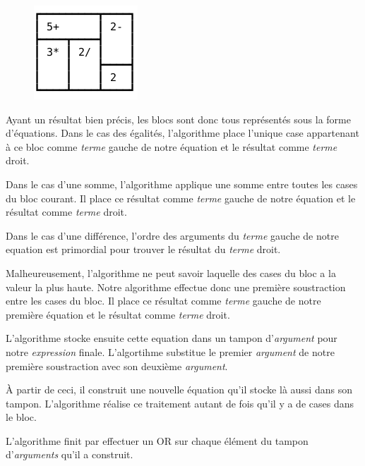 \documentclass[1]{report}
\begin{document}
\begin{itemize}
        \begin{figure}[H]
            \centering
            \includegraphics[scale=0.9]{kenekn3.png}
        \end{figure}

        Ayant un résultat bien précis, les blocs sont donc tous représentés sous la forme d'équations. Dans le cas des égalités, l'algorithme place l'unique case appartenant à ce bloc comme \textit{terme} gauche de notre équation et le résultat comme \textit{terme} droit. \newline

        Dans le cas d'une somme, l'algorithme applique une somme entre toutes les cases du bloc courant. Il place ce résultat comme \textit{terme} gauche de notre équation et le résultat comme \textit{terme} droit. \newline

        Dans le cas d'une différence, l'ordre des arguments du \textit{terme} gauche de notre equation est primordial pour trouver le résultat du \textit{terme} droit.
        
        Malheureusement, l'algorithme ne peut savoir laquelle des cases du bloc a la valeur la plus haute. Notre algorithme effectue donc une première soustraction entre les cases du bloc. Il place ce résultat comme \textit{terme} gauche de notre première équation et le résultat comme \textit{terme} droit. \newline
        
        L'algorithme stocke ensuite cette equation dans un tampon d'\textit{argument} pour notre \textit{expression} finale. L'algortihme substitue le premier \textit{argument} de notre première soustraction avec son deuxième \textit{argument}. 
        
        À partir de ceci, il construit une nouvelle équation qu'il stocke là aussi dans son tampon. L'algorithme réalise ce traitement autant de fois qu'il y a de cases dans le bloc. \newline
        
        L'algorithme finit par effectuer un OR sur chaque élément du tampon d'\textit{arguments} qu'il a construit. \newline


\end{itemize}
\end{document}
